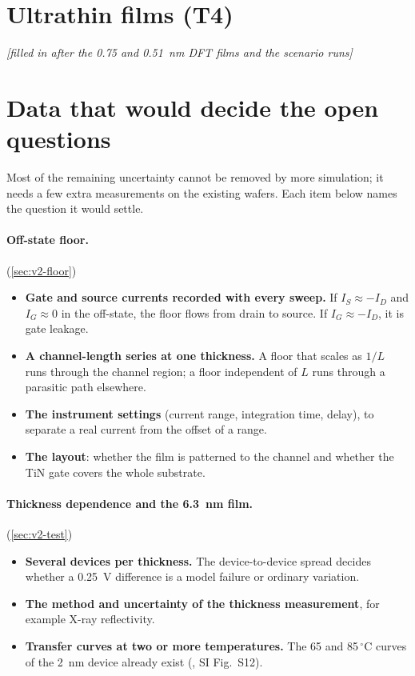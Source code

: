 \section{Ultrathin films (T4)}
\label{sec:v2-thin}
\textit{[filled in after the 0.75 and 0.51~nm DFT films and the scenario runs]}

\section{Data that would decide the open questions}
\label{sec:v2-data}

\begin{v2plain}
Most of the remaining uncertainty cannot be removed by more simulation; it needs a few extra measurements on the
existing wafers. Each item below names the question it would settle.
\end{v2plain}

\paragraph{Off-state floor.} (\cref{sec:v2-floor})
\begin{itemize}
\item \textbf{Gate and source currents recorded with every sweep.} If $I_S \approx -I_D$ and $I_G \approx 0$ in the
off-state, the floor flows from drain to source. If $I_G \approx -I_D$, it is gate leakage.
\item \textbf{A channel-length series at one thickness.} A floor that scales as $1/L$ runs through the channel region;
a floor independent of $L$ runs through a parasitic path elsewhere.
\item \textbf{The instrument settings} (current range, integration time, delay), to separate a real current from the
offset of a range.
\item \textbf{The layout}: whether the film is patterned to the channel and whether the TiN gate covers the whole
substrate.
\end{itemize}

\paragraph{Thickness dependence and the 6.3~nm film.} (\cref{sec:v2-test})
\begin{itemize}
\item \textbf{Several devices per thickness.} The device-to-device spread decides whether a 0.25~V difference is a
model failure or ordinary variation.
\item \textbf{The method and uncertainty of the thickness measurement}, for example X-ray reflectivity.
\item \textbf{Transfer curves at two or more temperatures.} The 65 and 85\,$^\circ$C curves of the 2~nm device
already exist (\citet{Januar2026}, SI Fig.~S12).
\end{itemize}

